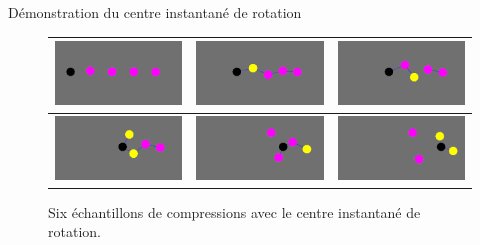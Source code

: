 \documentclass{beamer}
\begin{document}
\begin{frame}{Démonstration du centre instantané de rotation}
  \begin{figure}
    \begin{center}
    \begin{tabular}{|M|M|M|}
      \hline
      \includegraphics[width=3.5cm]{Images/cir_1.png} &
      \includegraphics[width=3.5cm]{Images/cir_2.png} &
      \includegraphics[width=3.5cm]{Images/cir_3.png} \\
      \hline
      \includegraphics[width=3.5cm]{Images/cir_4.png} &
      \includegraphics[width=3.5cm]{Images/cir_5.png} &
      \includegraphics[width=3.5cm]{Images/cir_6.png} \\
      \hline
    \end{tabular}
    \end{center}
    \caption{Six échantillons de compressions avec le centre instantané de rotation.}
  \end{figure}
\end{frame}
\end{document}
